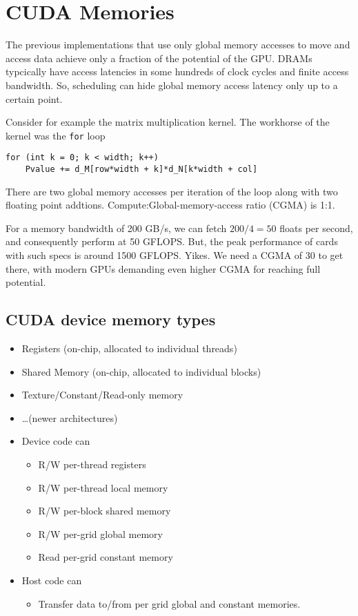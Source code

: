\section*{CUDA Memories}
The previous implementations that use only global memory accesses
to move and access data achieve only a fraction of the potential
of the GPU. DRAMs typcically have access latencies in some hundreds
of clock cycles and finite access bandwidth. So, scheduling can
hide global memory access latency only up to a certain point.

Consider for example the matrix multiplication kernel. The workhorse
of the kernel was the \texttt{for} loop
\begin{verbatim}
for (int k = 0; k < width; k++)
    Pvalue += d_M[row*width + k]*d_N[k*width + col]
\end{verbatim}
There are two global memory accesses per iteration of the loop along
with two floating point addtions. Compute:Global-memory-access ratio
(CGMA) is 1:1.

For a memory bandwidth of 200 GB/s, we can fetch $200 / 4 = 50$ floats
per second, and consequently perform at 50 GFLOPS. But, the peak
performance of cards with such specs is around 1500 GFLOPS. Yikes.
We need a CGMA of 30 to get there, with modern GPUs demanding even
higher CGMA for reaching full potential.

\subsection*{CUDA device memory types}
\begin{itemize}
    \item Registers (on-chip, allocated to individual threads)
    \item Shared Memory (on-chip, allocated to individual blocks)
    \item Texture/Constant/Read-only memory
    \item \ldots (newer architectures)
\end{itemize}

\begin{itemize}
    \item Device code can
        \begin{itemize}
            \item R/W per-thread registers
            \item R/W per-thread local memory
            \item R/W per-block shared memory
            \item R/W per-grid global memory
            \item Read per-grid constant memory
        \end{itemize}
    \item Host code can
        \begin{itemize}
            \item Transfer data to/from per grid global and constant
                memories.
        \end{itemize}
\end{itemize}

